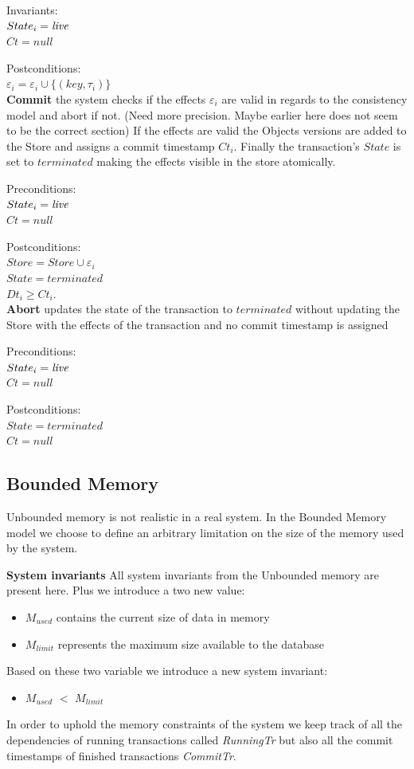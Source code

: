 \documentclass[systeme,french,english]{compas2022}
\begin{document}
Invariants:\\
$State_i = \emph{live}$ \\
$Ct = null$

Postconditions:\\
$\varepsilon_i = \varepsilon_i \cup \{(key, \tau_i)\}$ \\

\textbf{Commit} the system checks if the effects $\varepsilon_i$ are valid in regards to the consistency model and abort if not. (Need more precision. Maybe earlier here does not seem to be the correct section)
If the effects are valid the Objects versions are added to the Store and assigns a commit timestamp $Ct_i$.
Finally the transaction's $State$ is set to $terminated$ making the effects visible in the store atomically.

Preconditions:\\ 
$State_i = \emph{live}$ \\
$Ct = null$

Postconditions:\\
$Store = Store \cup \varepsilon_i$\\
$State = terminated$\\
$Dt_i \geq Ct_i$.\\

\textbf{Abort} updates the state of the transaction to $terminated$ without updating the Store with the effects of the transaction and no commit timestamp is assigned

Preconditions:\\ 
$State_i = \emph{live}$ \\
$Ct = null$

Postconditions:\\
$State = terminated$\\
$Ct = null$

\subsection{Bounded Memory}

Unbounded memory is not realistic in a real system.
In the Bounded Memory model we choose to define an arbitrary limitation on the size of the memory used by the system.

\textbf{System invariants}
All system invariants from the Unbounded memory are present here.
Plus we introduce a two new value:
\begin{itemize}
  \item \emph{$M_{used}$} contains the current size of data in memory
  \item \emph{$M_{limit}$} represents the maximum size available to the database
\end{itemize}
Based on these two variable we introduce a new system invariant:
\begin{itemize}
  \item \emph{$M_{used}$} $<$ \emph{$M_{limit}$}
\end{itemize}
In order to uphold the memory constraints of the system we keep track of all the dependencies of running transactions called \emph{RunningTr} but also all the commit timestamps of finished transactions \emph{CommitTr}.
\end{document}

